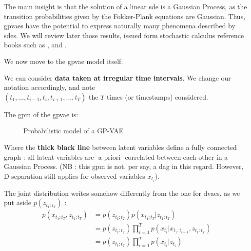 The main insight is that the solution of a linear \gls{sde} is a Gaussian Process, as the transition probabilities given by the Fokker-Plank equations are Gaussian.
Thus, \glspl{gpvae} have the potential to express naturally many phenomena described by \glspl{sde}. 
We will review later those results, issued form stochastic calculus reference books such as \cite{mouvement-brownien-calcul-ito}, \cite{sarkka_applied_2019} and \cite{cours-jf-legall}. 

We now move to the \gls{gpvae} model itself.

We can consider \textbf{data taken at irregular time intervals}. We change our notation accordingly, and note \\
$(t_1, ..., t_{i-1}, t_i, t_{i+1}, ..., t_T)$ the $T$ times (or timestamps) considered. 

The \gls{gpm} of the \gls{gpvae} is:

\begin{figure}[H]
    \centering
    \label{fig:graphical_model_gpvae}
\caption{Probabilistic model of a GP-VAE}
\end{figure}

Where the \textbf{thick black line} between latent variables define a fully connected graph : all latent variables are -a priori- correlated between each other in a Gaussian Process. (NB : this \gls{gpm} is not, per say, a \gls{dag} in this regard. However, D-separation still applies for observed variables $x_{t_i}$).

The joint distribution writes somehow differently from the one for \glspl{dvae}, as we put aside $p(z_{t_1:t_T})$ :
\begin{align}
\label{joint_gpvae}
    p(x_{t_1:t_T}, z_{t_1:t_T}) &= p(z_{t_1:t_T}) p(x_{t_1:t_T} \vert z_{t_1:t_T}) \\
    &= p(z_{t_1:t_T}) \prod_{i=1}^T p(x_{t_i} \vert x_{t_1:t_{i-1}}, z_{t_1:t_T}) \\
    &= p(z_{t_1:t_T}) \prod_{i=1}^T p(x_{t_i} \vert z_{t_{i}})
\end{align}

